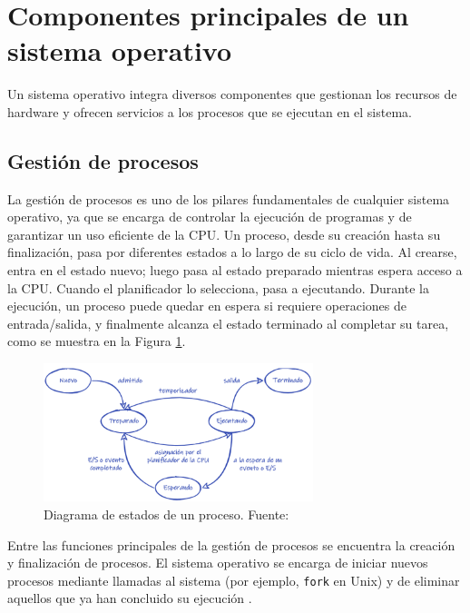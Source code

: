 \section{Componentes principales de un sistema operativo}

Un sistema operativo integra diversos componentes que gestionan los recursos de hardware y ofrecen servicios a los procesos que se ejecutan en el sistema.  

\subsection{Gestión de procesos}

La gestión de procesos es uno de los pilares fundamentales de cualquier sistema operativo, ya que se encarga de controlar la ejecución de programas y de garantizar un uso eficiente de la CPU. Un proceso, desde su creación hasta su finalización, pasa por diferentes estados a lo largo de su ciclo de vida. Al crearse, entra en el estado nuevo; luego pasa al estado preparado mientras espera acceso a la CPU. Cuando el planificador lo selecciona, pasa a ejecutando. Durante la ejecución, un proceso puede quedar en espera si requiere operaciones de entrada/salida, y finalmente alcanza el estado terminado al completar su tarea, como se muestra en la Figura \ref{fig:ciclo_vida_proceso}.  

\begin{figure}[H]
    \centering
    \includegraphics[width=0.7\textwidth]{figures/ciclo_vida_proceso.png}
    \caption[Diagrama de estados de un proceso]%
            {Diagrama de estados de un proceso. Fuente: \citep{torres2024}}
    \label{fig:ciclo_vida_proceso}
\end{figure}

Entre las funciones principales de la gestión de procesos se encuentra la creación y finalización de procesos. El sistema operativo se encarga de iniciar nuevos procesos mediante llamadas al sistema (por ejemplo, \texttt{fork} en Unix) y de eliminar aquellos que ya han concluido su ejecución \citep{juan2015}.  

